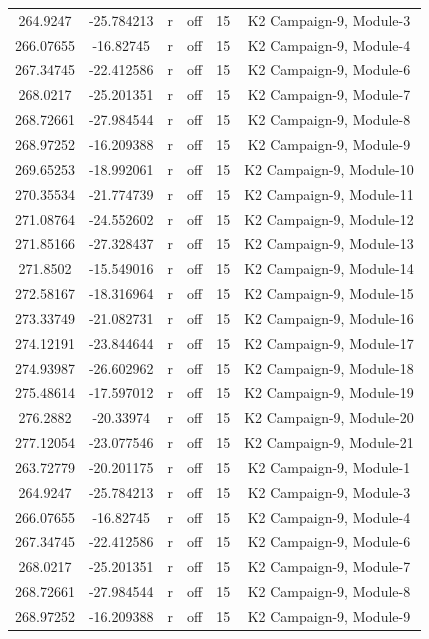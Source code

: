\documentclass[11pt]{article}
\begin{document}
\begin{center}
\begin{longtable}{|c|c|c|c|c|c|}
264.9247 & -25.784213 & r & off &15 & K2 Campaign-9, Module-3\\
266.07655 & -16.82745 & r & off &15 & K2 Campaign-9, Module-4\\
267.34745 & -22.412586 & r & off &15 & K2 Campaign-9, Module-6\\
268.0217 & -25.201351 & r & off &15 & K2 Campaign-9, Module-7\\
268.72661 & -27.984544 & r & off &15 & K2 Campaign-9, Module-8\\
268.97252 & -16.209388 & r & off &15 & K2 Campaign-9, Module-9\\
269.65253 & -18.992061 & r & off &15 & K2 Campaign-9, Module-10\\
270.35534 & -21.774739 & r & off &15 & K2 Campaign-9, Module-11\\
271.08764 & -24.552602 & r & off &15 & K2 Campaign-9, Module-12\\
271.85166 & -27.328437 & r & off &15 & K2 Campaign-9, Module-13\\
271.8502 & -15.549016 & r & off &15 & K2 Campaign-9, Module-14\\
272.58167 & -18.316964 & r & off &15 & K2 Campaign-9, Module-15\\
273.33749 & -21.082731 & r & off &15 & K2 Campaign-9, Module-16\\
274.12191 & -23.844644 & r & off &15 & K2 Campaign-9, Module-17\\
274.93987 & -26.602962 & r & off &15 & K2 Campaign-9, Module-18\\
275.48614 & -17.597012 & r & off &15 & K2 Campaign-9, Module-19\\
276.2882 & -20.33974 & r & off &15 & K2 Campaign-9, Module-20\\
277.12054 & -23.077546 & r & off &15 & K2 Campaign-9, Module-21\\
263.72779 & -20.201175 & r & off &15 & K2 Campaign-9, Module-1\\
264.9247 & -25.784213 & r & off &15 & K2 Campaign-9, Module-3\\
266.07655 & -16.82745 & r & off &15 & K2 Campaign-9, Module-4\\
267.34745 & -22.412586 & r & off &15 & K2 Campaign-9, Module-6\\
268.0217 & -25.201351 & r & off &15 & K2 Campaign-9, Module-7\\
268.72661 & -27.984544 & r & off &15 & K2 Campaign-9, Module-8\\
268.97252 & -16.209388 & r & off &15 & K2 Campaign-9, Module-9\\

\end{longtable}
\end{center}
\end{document}
